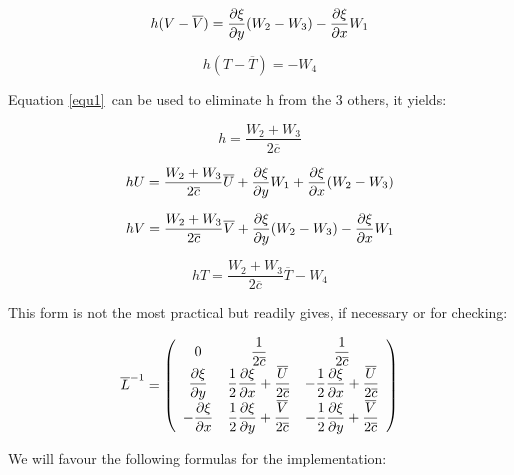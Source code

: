 \begin{equation}
h(V-\overline{V})=\dfrac{\partial \xi }{\partial y}(W_{2}-W_{3})-\dfrac{%
\partial \xi }{\partial x}W_{1}  \label{equ3}
\end{equation}

\begin{equation}
h(T-\overline{T})=-W_{4}  \label{equ4}
\end{equation}

Equation \ref{equ1}\ can be used to eliminate h from the 3 others, it yields:

\begin{equation}
h=\dfrac{W_{2}+W_{3}}{2\overline{c}}
\end{equation}

\begin{equation}
hU=\dfrac{W_{2}+W_{3}}{2\overline{c}}\overline{U}+\dfrac{\partial \xi }{%
\partial y}W_{1}+\dfrac{\partial \xi }{\partial x}(W_{2}-W_{3})
\end{equation}

\begin{equation}
hV=\dfrac{W_{2}+W_{3}}{2\overline{c}}\overline{V}+\dfrac{\partial \xi }{%
\partial y}(W_{2}-W_{3})-\dfrac{\partial \xi }{\partial x}W_{1}
\end{equation}

\begin{equation}
hT=\dfrac{W_{2}+W_{3}}{2\overline{c}}\overline{T}-W_{4}
\end{equation}

This form is not the most practical but readily gives, if necessary or for
checking:

\begin{equation}
\overline{L}^{-1}=\left( 
\begin{array}{ccc}
0 & \dfrac{1}{2\overline{c}} & \dfrac{1}{2\overline{c}} \\ 
\dfrac{\partial \xi }{\partial y} & \dfrac{1}{2}\dfrac{\partial \xi }{%
\partial x}+\dfrac{\overline{U}}{2\overline{c}} & -\dfrac{1}{2}\dfrac{\partial
\xi }{\partial x}+\dfrac{\overline{U}}{2\overline{c}} \\ 
-\dfrac{\partial \xi }{\partial x} & \dfrac{1}{2}\dfrac{\partial \xi }{%
\partial y}+\dfrac{\overline{V}}{2\overline{c}} & -\dfrac{1}{2}\dfrac{\partial
\xi }{\partial y}+\dfrac{\overline{V}}{2\overline{c}}%
\end{array}
\right)
\end{equation}

We will favour the following formulas for the implementation:


